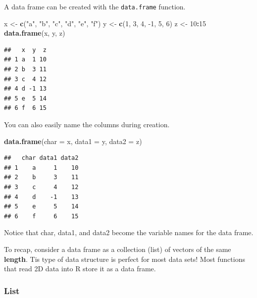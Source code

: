 \documentclass[
]{book}
\newenvironment{Shaded}{\begin{snugshade}}{\end{snugshade}}
\newcommand{\DataTypeTok}[1]{\textcolor[rgb]{0.13,0.29,0.53}{#1}}
\newcommand{\DecValTok}[1]{\textcolor[rgb]{0.00,0.00,0.81}{#1}}
\newcommand{\KeywordTok}[1]{\textcolor[rgb]{0.13,0.29,0.53}{\textbf{#1}}}
\newcommand{\NormalTok}[1]{#1}
\newcommand{\OperatorTok}[1]{\textcolor[rgb]{0.81,0.36,0.00}{\textbf{#1}}}
\newcommand{\StringTok}[1]{\textcolor[rgb]{0.31,0.60,0.02}{#1}}
\theoremstyle{definition}
\theoremstyle{definition}
\theoremstyle{definition}
\theoremstyle{remark}
\begin{document}
A data frame can be created with the \texttt{data.frame} function.

\begin{Shaded}
\begin{Highlighting}[]
\NormalTok{x <-}\StringTok{ }\KeywordTok{c}\NormalTok{(}\StringTok{"a"}\NormalTok{, }\StringTok{"b"}\NormalTok{, }\StringTok{"c"}\NormalTok{, }\StringTok{"d"}\NormalTok{, }\StringTok{"e"}\NormalTok{, }\StringTok{"f"}\NormalTok{)}
\NormalTok{y <-}\StringTok{ }\KeywordTok{c}\NormalTok{(}\DecValTok{1}\NormalTok{, }\DecValTok{3}\NormalTok{, }\DecValTok{4}\NormalTok{, }\DecValTok{-1}\NormalTok{, }\DecValTok{5}\NormalTok{, }\DecValTok{6}\NormalTok{)}
\NormalTok{z <-}\StringTok{ }\DecValTok{10}\OperatorTok{:}\DecValTok{15}
\KeywordTok{data.frame}\NormalTok{(x, y, z)}
\end{Highlighting}
\end{Shaded}

\begin{verbatim}
##   x  y  z
## 1 a  1 10
## 2 b  3 11
## 3 c  4 12
## 4 d -1 13
## 5 e  5 14
## 6 f  6 15
\end{verbatim}

You can also easily name the columns during creation.

\begin{Shaded}
\begin{Highlighting}[]
\KeywordTok{data.frame}\NormalTok{(}\DataTypeTok{char =}\NormalTok{ x, }\DataTypeTok{data1 =}\NormalTok{ y, }\DataTypeTok{data2 =}\NormalTok{ z)}
\end{Highlighting}
\end{Shaded}

\begin{verbatim}
##   char data1 data2
## 1    a     1    10
## 2    b     3    11
## 3    c     4    12
## 4    d    -1    13
## 5    e     5    14
## 6    f     6    15
\end{verbatim}

Notice that char, data1, and data2 become the variable names for the data frame.

To recap, consider a data frame as a collection (list) of vectors of the same \textbf{length}. Tis type of data structure is perfect for most data sets! Most functions that read 2D data into R store it as a data frame.

\hypertarget{list}{%
\subsubsection{List}\label{list}}
\end{document}
